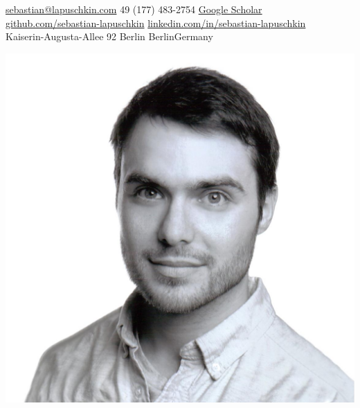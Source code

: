 \documentclass[10pt,a4paper]{article} %
\begin{document}

\noindent
\begin{minipage}{.8\textwidth}


\noindent\href{mailto:sebastian@lapuschkin.com}{sebastian@lapuschkin.com}\bull %
\textsmaller{+}49 (177) 483-2754\bull %
\href{https://scholar.google.com/citations?user=wpLQuroAAAAJ}{Google Scholar}
\\
\href{https://github.com/sebastian-lapuschkin}{github.com/sebastian-lapuschkin}\bull %
\href{https://www.linkedin.com/in/sebastian-lapuschkin}{linkedin.com/in/sebastian-lapuschkin} %
\\
Kaiserin-Augusta-Allee 92 Berlin \bull Berlin\bull Germany %
\end{minipage}
\begin{minipage}{.2\textwidth}
\includegraphics[width=\textwidth]{resources/mug.jpg}
\end{minipage}
\end{document}
